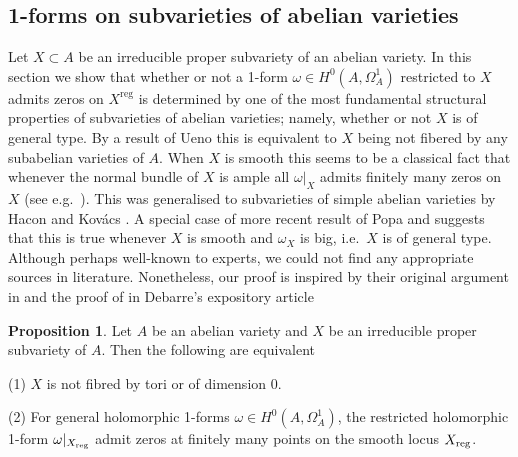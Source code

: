 \documentclass[a4paper,12pt,reqno]{amsart}
\theoremstyle{plain}
\theoremstyle{definition}
\newtheorem{proposition}[theorem]{Proposition}
\theoremstyle{remark}
\DeclareMathOperator{\reg}{reg}
\begin{document}
\subsection{1-forms on subvarieties of abelian varieties}

Let $X\subset A$ be an irreducible proper subvariety of an abelian variety. In this section we show that whether or not a 1-form $\omega\in H^0(A,\Omega_A^1)$
restricted to $X$ admits zeros on $X^{\reg}$ is determined by one of the most fundamental
 structural properties of subvarieties of abelian varieties;
 namely, whether or not
$X$ is of general type. By a result of Ueno \cite[10.9]{Uen75} this is equivalent to $X$ being not fibered by any subabelian varieties of $A$. 
When $X$ is smooth 
this seems to be a classical fact that whenever the normal bundle of $X$ is ample all $\omega|_X$ admits finitely many zeros on $X$
(see e.g.\ \cite[Lemma 3.1]{Deb}). This was generalised to subvarieties of simple abelian varieties by 
Hacon and Kov\'acs \cite[Proposition 3.1]{HK05}. A special case of more recent result of Popa and \cite{PS14} suggests that this is true whenever $X$ is smooth and
$\omega_X$ is big,
i.e.\ $X$ is of general type. Although perhaps well-known to experts, we could not find any appropriate sources in literature. Nonetheless, our proof is inspired
by their original argument in\cite[Proposition 3.1]{HK05} and the proof of \cite[Lemma 3.1]{Deb} in Debarre's expository article

\begin{proposition}\label{van-nonsimple}
Let $A$ be an abelian variety and $X$ be an irreducible proper subvariety of $A$. Then the following are equivalent

(1) $X$ is not fibred by tori or of dimension 0. 

(2) For general holomorphic 1-forms $\omega\in H^0(A, \Omega_A^1)$, the restricted holomorphic 1-form $\omega|_{X_{\textnormal{reg}}}$ admit zeros at finitely many points on the smooth locus $X_{\textnormal{reg}}$.
\end{proposition}
\end{document}
